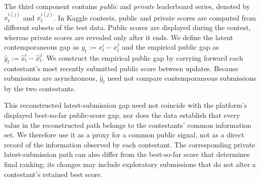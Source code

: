 \documentclass[mnsc]{informs3}
\begin{document}
The third component contains \textit{public} and \textit{private} leaderboard series, denoted by $\hat{x}^{i(j)}_t$ and $x^{i(j)}_t$.
In Kaggle contests, public and private scores are computed from different subsets of the test data. Public scores are displayed during the contest, whereas private scores are revealed only after it ends.
We define the latent contemporaneous gap as $y_t:=x_t^i-x_t^j$ and the empirical public gap as $\hat y_t:=\hat x_t^i-\hat x_t^j$. We construct the empirical public gap by carrying forward each contestant's most recently submitted public score between updates. Because submissions are asynchronous, $\hat y_t$ need not compare contemporaneous submissions by the two contestants.

This reconstructed latest-submission gap need not coincide with the platform's displayed best-so-far public-score gap, nor does the data establish that every value in the reconstructed path belongs to the contestants' common information set. We therefore use it as a proxy for a common public signal, not as a direct record of the information observed by each contestant. The corresponding private latest-submission path can also differ from the best-so-far score that determines final ranking; its changes may include exploratory submissions that do not alter a contestant's retained best score.
\end{document}
